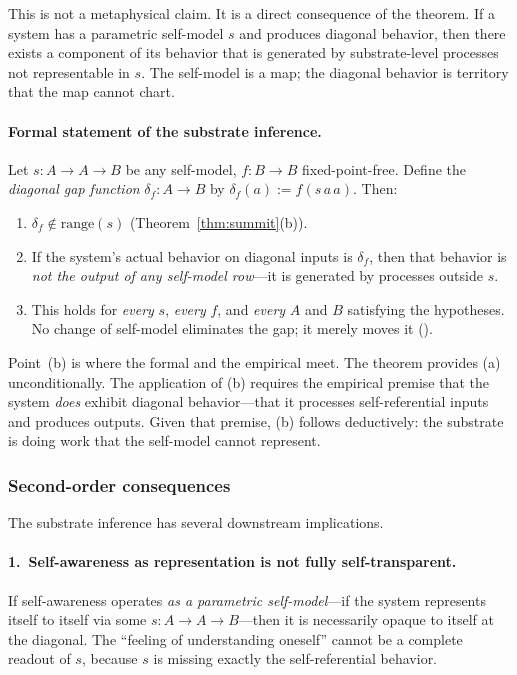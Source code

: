 \documentclass[11pt]{article}
\begin{document}
This is not a metaphysical claim.  It is a direct consequence of
the theorem.  If a system has a parametric self-model $s$ and
produces diagonal behavior, then there exists a component of its
behavior that is generated by substrate-level processes not
representable in $s$.  The self-model is a map; the diagonal
behavior is territory that the map cannot chart.

\paragraph{Formal statement of the substrate inference.}
Let $s : A \to A \to B$ be any self-model, $f : B \to B$
fixed-point-free.  Define the \emph{diagonal gap function}
$\delta_f : A \to B$ by $\delta_f(a) := f(s\,a\,a)$.  Then:
\begin{enumerate}[label=(\alph*),itemsep=0.2ex]
\item $\delta_f \notin \mathrm{range}(s)$
  (Theorem~\ref{thm:summit}(b)).
\item If the system's actual behavior on diagonal inputs is
  $\delta_f$, then that behavior is \emph{not the output of any
  self-model row}---it is generated by processes outside $s$.
\item This holds for \emph{every} $s$, \emph{every} $f$, and
  \emph{every} $A$ and $B$ satisfying the hypotheses.  No change
  of self-model eliminates the gap; it merely moves it
  ().
\end{enumerate}

\noindent
Point~(b) is where the formal and the empirical meet.  The theorem
provides (a) unconditionally.  The application of (b) requires the
empirical premise that the system \emph{does} exhibit diagonal
behavior---that it processes self-referential inputs and produces
outputs.  Given that premise, (b) follows deductively: the substrate
is doing work that the self-model cannot represent.

\subsubsection{Second-order consequences}

The substrate inference has several downstream implications.

\paragraph{1.\ Self-awareness as representation is not fully self-transparent.}
If self-awareness operates \emph{as a parametric self-model}---if
the system represents itself to itself via some $s : A \to A \to B$---then
it is necessarily opaque to itself at the diagonal.  The ``feeling
of understanding oneself'' cannot be a complete readout of $s$,
because $s$ is missing exactly the self-referential behavior.
\end{document}
